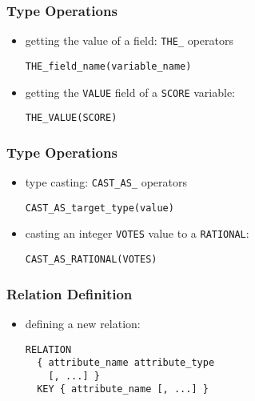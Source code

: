 \documentclass[dvipsnames]{beamer}
\theoremstyle{plain}
\begin{document}
\begin{frame}[fragile]
  \frametitle{Type Operations}

  \begin{itemize}
    \item getting the value of a field: \lstinline!THE_! operators
    \begin{lstlisting}
THE_field_name(variable_name)
    \end{lstlisting}
  \end{itemize}

  \begin{example}
    \begin{itemize}
      \item getting the \texttt{VALUE} field of a \texttt{SCORE} variable:
      \begin{lstlisting}
THE_VALUE(SCORE)
      \end{lstlisting}
    \end{itemize}
  \end{example}
\end{frame}

\begin{frame}[fragile]
  \frametitle{Type Operations}

  \begin{itemize}
    \item type casting: \lstinline!CAST_AS_! operators
    \begin{lstlisting}
CAST_AS_target_type(value)
    \end{lstlisting}
  \end{itemize}

  \begin{example}
    \begin{itemize}
      \item casting an integer \texttt{VOTES} value to a \texttt{RATIONAL}:
      \begin{lstlisting}
CAST_AS_RATIONAL(VOTES)
      \end{lstlisting}
    \end{itemize}
  \end{example}
\end{frame}

\begin{frame}[fragile]
  \frametitle{Relation Definition}

  \begin{itemize}
    \item defining a new relation:
    \begin{lstlisting}
RELATION
  { attribute_name attribute_type
    [, ...] }
  KEY { attribute_name [, ...] }
    \end{lstlisting}
  \end{itemize}
\end{frame}
\end{document}
